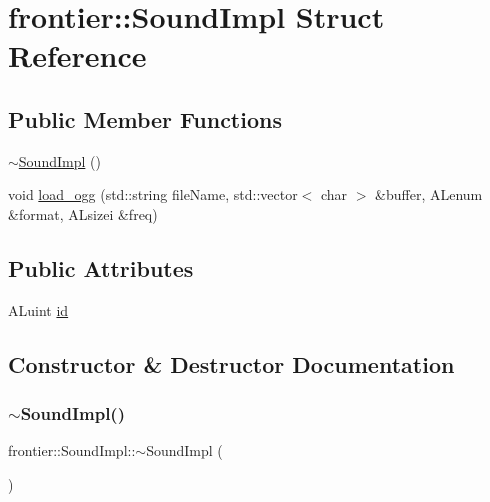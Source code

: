 \hypertarget{structfrontier_1_1_sound_impl}{}\section{frontier\+:\+:Sound\+Impl Struct Reference}
\label{structfrontier_1_1_sound_impl}
\subsection*{Public Member Functions}
\begin{DoxyCompactItemize}
\item 
\hyperlink{structfrontier_1_1_sound_impl_af5689c9a50ec077e5f29747db97015b9}{$\sim$\+Sound\+Impl} ()
\item 
void \hyperlink{structfrontier_1_1_sound_impl_ae4f90e7fb56a7ad9b4d506071e90fa58}{load\+\_\+ogg} (std\+::string file\+Name, std\+::vector$<$ char $>$ \&buffer, A\+Lenum \&format, A\+Lsizei \&freq)
\end{DoxyCompactItemize}
\subsection*{Public Attributes}
\begin{DoxyCompactItemize}
\item 
A\+Luint \hyperlink{structfrontier_1_1_sound_impl_ae8b2e75a8ca0784b44f0e167d69a1128}{id}
\end{DoxyCompactItemize}


\subsection{Constructor \& Destructor Documentation}
\mbox{\label{structfrontier_1_1_sound_impl_af5689c9a50ec077e5f29747db97015b9}} 
\subsubsection{\texorpdfstring{$\sim$\+Sound\+Impl()}{~SoundImpl()}}
{\footnotesize\ttfamily frontier\+::\+Sound\+Impl\+::$\sim$\+Sound\+Impl (\begin{DoxyParamCaption}{ }\end{DoxyParamCaption})\hspace{0.3cm}{\ttfamily [inline]}}



